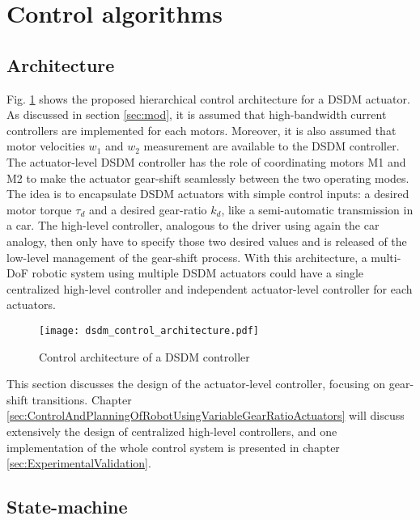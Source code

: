 
\newpage

\section{Control algorithms}

\subsection{Architecture}

Fig. \ref{fig:dsdm_control_architecture} shows the proposed hierarchical control architecture for a DSDM actuator. As discussed in section \ref{sec:mod}, it is assumed that high-bandwidth current controllers are implemented for each motors. Moreover, it is also assumed that motor velocities $w_1$ and $w_2$ measurement are available to the DSDM controller. The actuator-level DSDM controller has the role of coordinating motors M1 and M2 to make the actuator gear-shift seamlessly between the two operating modes. The idea is to encapsulate DSDM actuators with simple control inputs: a desired motor torque $\tau_d$ and a desired gear-ratio $k_d$, like a semi-automatic transmission in a car. The high-level controller, analogous to the driver using again the car analogy, then only have to specify those two desired values and is released of the low-level management of the gear-shift process. With this architecture, a multi-DoF robotic system using multiple DSDM actuators could have a single centralized high-level controller and independent actuator-level controller for each actuators. 

\begin{figure}[H]
	\centering
		\texttt{[image: dsdm\_control\_architecture.pdf]}
	\caption{Control architecture of a DSDM controller}
	\label{fig:dsdm_control_architecture}
\end{figure}

This section discusses the design of the actuator-level controller, focusing on gear-shift transitions. Chapter \ref{sec:ControlAndPlanningOfRobotUsingVariableGearRatioActuators} will discuss extensively the design of centralized high-level controllers, and one implementation of the whole control system is presented in chapter \ref{sec:ExperimentalValidation}.


\subsection{State-machine}

